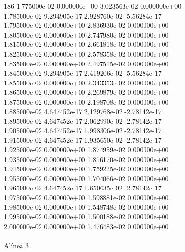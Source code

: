 186	1.775000e-02	0.000000e+00	3.023563e-02	0.000000e+00	\\ 	1.785000e-02	9.294905e-17	2.928760e-02	-5.56284e-17	\\ 	1.795000e-02	0.000000e+00	2.836930e-02	0.000000e+00	\\ 	1.805000e-02	0.000000e+00	2.747980e-02	0.000000e+00	\\ 	1.815000e-02	0.000000e+00	2.661818e-02	0.000000e+00	\\ 	1.825000e-02	0.000000e+00	2.578358e-02	0.000000e+00	\\ 	1.835000e-02	0.000000e+00	2.497515e-02	0.000000e+00	\\ 	1.845000e-02	9.294905e-17	2.419206e-02	-5.56284e-17	\\ 	1.855000e-02	0.000000e+00	2.343353e-02	0.000000e+00	\\ 	1.865000e-02	0.000000e+00	2.269879e-02	0.000000e+00	\\ 	1.875000e-02	0.000000e+00	2.198708e-02	0.000000e+00	\\ 	1.885000e-02	4.647452e-17	2.129768e-02	-2.78142e-17	\\ 	1.895000e-02	4.647452e-17	2.062990e-02	-2.78142e-17	\\ 	1.905000e-02	4.647452e-17	1.998306e-02	-2.78142e-17	\\ 	1.915000e-02	4.647452e-17	1.935650e-02	-2.78142e-17	\\ 	1.925000e-02	0.000000e+00	1.874959e-02	0.000000e+00	\\ 	1.935000e-02	0.000000e+00	1.816170e-02	0.000000e+00	\\ 	1.945000e-02	0.000000e+00	1.759225e-02	0.000000e+00	\\ 	1.955000e-02	0.000000e+00	1.704066e-02	0.000000e+00	\\ 	1.965000e-02	4.647452e-17	1.650635e-02	-2.78142e-17	\\ 	1.975000e-02	0.000000e+00	1.598881e-02	0.000000e+00	\\ 	1.985000e-02	0.000000e+00	1.548748e-02	0.000000e+00	\\ 	1.995000e-02	0.000000e+00	1.500188e-02	0.000000e+00	\\ 	2.000000e-02	0.000000e+00	1.476483e-02	0.000000e+00	\\ \hline
\\ \hline
                                   Alínea 3 \\ \hline
